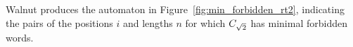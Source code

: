 Walnut produces the automaton in Figure~\ref{fig:min_forbidden_rt2}, indicating the pairs of the positions $i$ and lengths $n$ for which $C_{\sqrt{2}}$ has minimal forbidden words.


